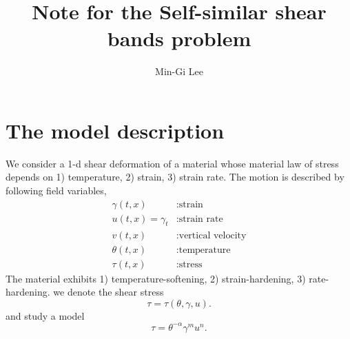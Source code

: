 \documentclass[a4paper,11pt]{article}
\begin{document}
\title{Note for the Self-similar shear bands problem}
\author{Min-Gi Lee\footnotemark[1]}
\date{}

\maketitle
\renewcommand{\thefootnote}{\fnsymbol{footnote}}
\renewcommand{\thefootnote}{\arabic{footnote}}


\maketitle

\tableofcontents

\section{The model description}
We consider a 1-d shear deformation of a material whose material law of stress depends on 1) temperature, 2) strain, 3) strain rate. The motion is described by following field variables,
\begin{equation} \label{eq:vars}
\begin{aligned}
 \gamma(t,x) &: \text{strain}\\
 u(t,x)=\gamma_t &: \text{strain rate}\\
 v(t,x) &: \text{vertical velocity}\\
 \theta(t,x) &: \text{temperature}\\
 \tau(t,x) &: \text{stress}
\end{aligned}
\end{equation}
The material exhibits 1) temperature-softening, 2) strain-hardening, 3) rate-hardening. we denote the shear stress
$$ \tau = \tau(\theta,\gamma,u). $$
and study a model
\begin{equation}
 \tau = \theta^{-\alpha}\gamma^m u^n. \label{eq:stresslaw}
\end{equation}
\end{document}

